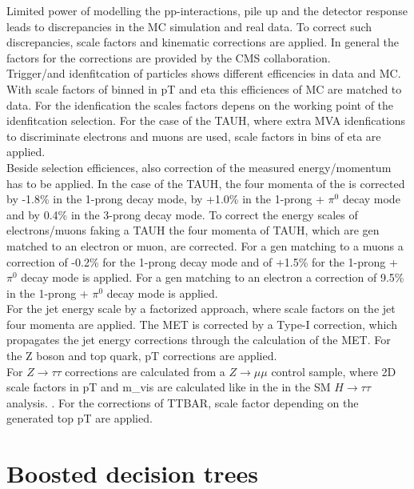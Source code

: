 Limited power of modelling the pp-interactions, pile up and the detector response leads to discrepancies in the \gls{MC} simulation and real data. To correct such discrepancies, scale factors and kinematic corrections are applied. In general the factors for the corrections are provided by the \gls{CMS} collaboration. \\

Trigger/and idenfitcation of particles shows different efficencies in data and \gls{MC}. With scale factors of binned in \gls{pT} and \gls{eta} this efficiences of \gls{MC} are matched to data. For the idenfication the scales factors depens on the working point of the idenfitcation selection. For the case of the \gls{TAUH}, where extra \gls{MVA} idenfications to discriminate electrons and muons are used, scale factors in bins of \gls{eta} are applied. \\

Beside selection efficiences, also correction of the measured energy/momentum has to be applied. In the case of the \gls{TAUH}, the four momenta of the is corrected by -1.8\% in the 1-prong decay mode, by +1.0\% in the 1-prong + $\pi^{0}$ decay mode and by 0.4\% in the 3-prong decay mode. To correct the energy scales of electrons/muons faking a \gls{TAUH} the four momenta of \gls{TAUH}, which are gen matched to an electron or muon, are corrected. For a gen matching to a muons a correction of -0.2\% for the 1-prong decay mode and of +1.5\% for the 1-prong + $\pi^{0}$ decay mode is applied. For a gen matching to an electron a correction of 9.5\% in the 1-prong + $\pi^{0}$ decay mode is applied. \\

For the jet energy scale by a factorized approach, where scale factors on the jet four momenta are applied. The \gls{MET} is corrected by a Type-I correction, which propagates the jet energy corrections through the calculation of the MET. For the Z boson and top quark, \gls{pT} corrections are applied. \\

For $Z\to\tau\tau$ corrections are calculated from a $Z\to\mu\mu$ control sample, where 2D scale factors in \gls{pT} and \gls{m_vis} are calculated like in the in the SM $H\to\tau\tau$ analysis. \cite{CMS-PAS-HIG-16-043}. For the corrections of \gls{TTBAR}, scale factor depending on the generated top \gls{pT} are applied.


\section{Boosted decision trees}

	


































